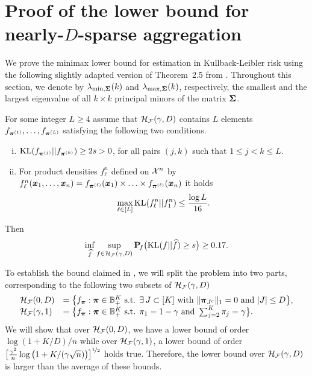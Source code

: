 \section[Proofs: Lower bounds]{Proof of the lower bound for nearly-$D$-sparse aggregation}\label{sec:proof-lower}
We prove the minimax lower bound for estimation in Kullback-Leibler risk using 
the following slightly adapted version of Theorem~2.5 from \cite{tsybakov2009Nonparametric}. 
Throughout this section, we denote by $\lambda_{\min,\boldsymbol\Sigma}(k)$ and $\lambda_{\max,\boldsymbol\Sigma}(k)$,
respectively, the smallest and the largest eigenvalue of all $k\times k$ principal minors of 
the matrix $\boldsymbol\Sigma$.
\begin{theorem}%
	\label{tsy_main_theo_nonparam_est}
	For some integer $L\ge 4$ assume that
	$\mathcal H_\mathcal F(\gamma,D)$ contains $L$ elements $f_{\boldsymbol \pi^{(1)}},\dots,f_{\boldsymbol \pi^{(L)}}$
	satisfying the following two conditions.
	\vspace{-10pt}
	\begin{enumerate}[(i)]
		\item ${\rm KL}(f_{\boldsymbol \pi^{(j)}}||f_{\boldsymbol \pi^{(k)}})\geq2s>0$,  for all pairs $(j,k)$ such that $1\leq j<k\leq L$.
		\item For product densities $f_{\ell}^n$ defined on $\mathcal X^n$ by $f_{\ell}^n(\boldsymbol x_1,\ldots,\boldsymbol x_n) =
		f_{\boldsymbol \pi^{(\ell)}}(\boldsymbol x_1)\times\ldots\times f_{\boldsymbol \pi^{(\ell)}}(\boldsymbol x_n)$ it holds 
		\begin{equation}
		\max_{\ell\in[L]} {\rm KL}(f_{\ell}^n||f_1^n) \leq \frac{\log L}{16}.
		\end{equation}
	\end{enumerate}
	\vspace{-10pt}
	Then
	\begin{equation}
	\inf_{\widehat f}\sup_{f \in \mathcal H_\mathcal F(\gamma,D)}\mathbf P\!_{f}\big({\rm KL}(f||\widehat f)\geq s\big)\geq 0.17.
	\end{equation}
\end{theorem}
To establish the bound claimed in , we will split the problem into two parts,
corresponding to the following two subsets of $\mathcal H_\mathcal F(\gamma,D)$
\begin{equation}
\begin{array}{ll}
\mathcal H_\mathcal F(0,D) &= \big\{f_{\boldsymbol \pi} : \boldsymbol \pi\in{\mathbb B}^K_+ \text{ s.t. }\exists \, J\subset [K]
\text{ with } \|\boldsymbol \pi_{J^c}\|_1 = 0 \text{ and } |J|\le D\big\}, \\
\mathcal H_\mathcal F(\gamma,1) &= \big\{f_{\boldsymbol \pi} : \boldsymbol \pi\in{\mathbb B}^K_+ \text{ s.t. } \pi_1 = 1-\gamma \text{ and } \sum_{j=2}^K\pi_j = \gamma \big\}.
\end{array}
\end{equation}
We will show that over $\mathcal H_\mathcal F(0,D)$, we have a lower bound of order $\log(1+K/D)/n$ while over 
$\mathcal H_\mathcal F(\gamma,1)$, a lower bound of order 
$\big[\frac{\gamma^2}{n}\log\big(1+K/(\gamma\sqrt{n})\big)\big]^{\nicefrac12}$ holds true. Therefore, 
the lower bound  over $\mathcal H_\mathcal F(\gamma,D)$ is larger than the average of these bounds.

